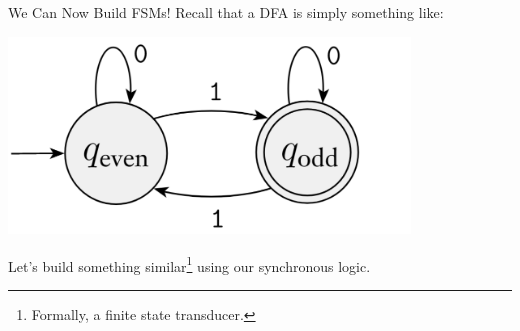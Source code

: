 \documentclass[aspectratio=169, 11pt, handout]{beamer}
\begin{document}
\begin{frame}{We Can Now Build FSMs!}
    Recall that a DFA is simply something like:
    \begin{center}
        \includegraphics[width=0.8\textwidth]{oddDFA.png}
    \end{center}
    \pause
    
    Let's build something similar\footnote{Formally, a finite state transducer.} using our synchronous logic.
    
\end{frame}
\end{document}

